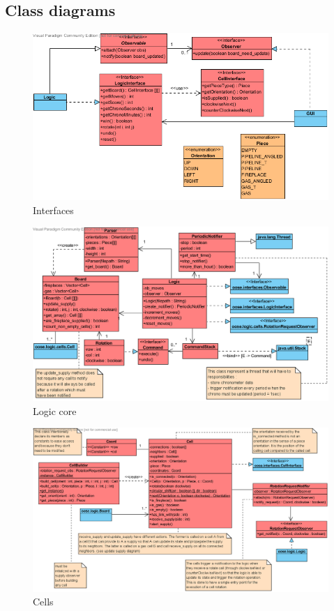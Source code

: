 \documentclass[a4paper,11pt]{article}
\begin{document}
\subsection{Class diagrams}
\begin{figure}[h]
	\center
	\includegraphics[angle=90,scale=1]{interfaces.png}
	\caption{Interfaces}
	\label{fig:inter}
\end{figure}
\begin{figure}[h]
	\center
	\includegraphics[angle=90,scale=1]{logic.png}
	\caption{Logic core}
	\label{fig:logic}
\end{figure}
\begin{figure}
	\center
	\includegraphics[angle=90,scale=1]{cells.png}
	\caption{Cells}
	\label{fig:cells}
\end{figure}
\end{document}
